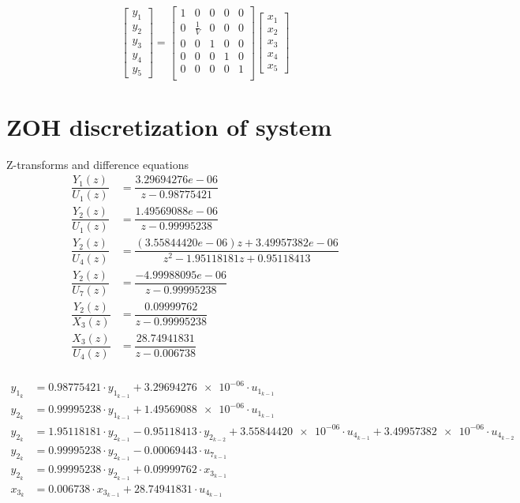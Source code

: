 \documentclass{article}
\begin{document}
\begin{equation}
    \begin{bmatrix}
    y_1\\    
    y_2\\
    y_3\\
    y_4\\
    y_5
    \end{bmatrix}
    =
    \begin{bmatrix}
        1 & 0 &0&0&0\\
        0 & \frac{1}{V}&0&0&0\\
        0 & 0 & 1 & 0 & 0\\
        0 & 0 & 0 & 1 & 0\\
        0 & 0 & 0 & 0 & 1\\
    \end{bmatrix}
    \begin{bmatrix}
        x_1\\    
        x_2\\
        x_3\\
        x_4\\
        x_5
    \end{bmatrix}
\end{equation}




\section{ZOH discretization of system}
Z-transforms and difference equations
\begin{align}
    \dfrac{Y_1(z)}{U_1(z)} &= \dfrac{3.29694276e-06}{z-0.98775421}\\
    \dfrac{Y_2(z)}{U_1(z)} &= \dfrac{1.49569088e-06}{z-0.99995238}\\
    \dfrac{Y_2(z)}{U_4(z)} &= \dfrac{\left(3.55844420e-06\right)z+3.49957382e-06}{z^2-1.95118181z+0.95118413}\\
    \dfrac{Y_2(z)}{U_7(z)} &= \dfrac{-4.99988095e-06}{z-0.99995238}\\
    \dfrac{Y_2(z)}{X_3(z)} &= \dfrac{0.09999762}{z-0.99995238}\\
    \dfrac{X_3(z)}{U_4(z)} &= \dfrac{28.74941831}{z-0.006738}\\
\end{align}

\begin{align*}
    y_{1_{k}} &= 0.98775421\cdot y_{1_{k-1}} + \num{3.29694276e-06}\cdot u_{1_{k-1}} \\
    y_{2_{k}} &= 0.99995238\cdot y_{1_{k-1}} + \num{1.49569088e-06}\cdot u_{1_{k-1}} \\
     y_{2_{k}} &= 1.95118181\cdot y_{2_{k-1}} - 0.95118413\cdot y_{2_{k-2}} + \num{3.55844420e-06}\cdot u_{4_{k-1}}+ \num{3.49957382e-06}\cdot u_{4_{k-2}}\\
    y_{2_{k}}    &= 0.99995238\cdot y_{2_{k-1}} - 0.00069443\cdot u_{7_{k-1}}\\
    y_{2_{k}}    &= 0.99995238\cdot y_{2_{k-1}} + 0.09999762\cdot x_{3_{k-1}}\\
    x_{3_{k}}    &= 0.006738\cdot x_{3_{k-1}} + 28.74941831\cdot u_{4_{k-1}}\\
\end{align*}
\end{document}
